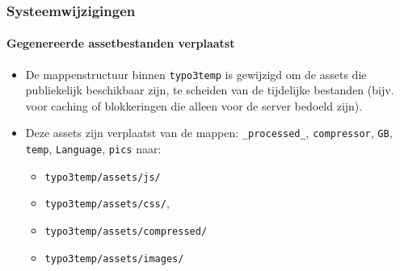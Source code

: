 \begin{frame}[fragile]
	\frametitle{Systeemwijzigingen}
	\framesubtitle{Gegenereerde assetbestanden verplaatst}

	\lstset{basicstyle=\tiny\ttfamily}

	\begin{itemize}

		\item De mappenstructuur binnen \texttt{typo3temp} is gewijzigd om de assets
			die publiekelijk beschikbaar zijn, te scheiden van de tijdelijke bestanden (bijv.
			voor caching of blokkeringen die alleen voor de server bedoeld zijn).

		\item Deze assets zijn verplaatst van de mappen:\newline
			\texttt{\_processed\_}, \texttt{compressor}, \texttt{GB}, \texttt{temp},
			\texttt{Language}, \texttt{pics}\newline
			naar:

			\begin{itemize}
				\item \texttt{typo3temp/assets/js/}
				\item \texttt{typo3temp/assets/css/},
				\item \texttt{typo3temp/assets/compressed/}
				\item \texttt{typo3temp/assets/images/}
			\end{itemize}

	\end{itemize}

\end{frame}

